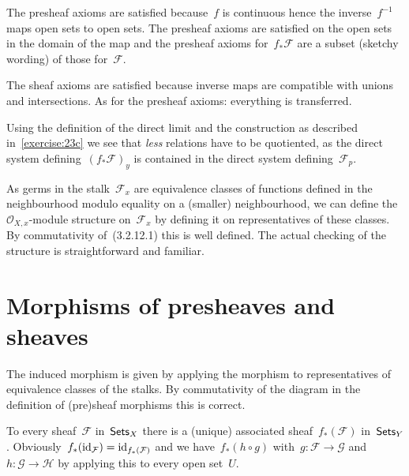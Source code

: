 \begin{exercise}
  The presheaf axioms are satisfied because~$f$ is continuous hence the inverse~$f^{-1}$ maps open sets to open sets. The presheaf axioms are satisfied on the open sets in the domain of the map and the presheaf axioms for~$f_*\mathcal{F}$ are a subset (sketchy wording) of those for~$\mathcal{F}$.

  The sheaf axioms are satisfied because inverse maps are compatible with unions and intersections. As for the presheaf axioms: everything is transferred.
\end{exercise}

\begin{exercise}
  Using the definition of the direct limit and the construction as described in~\autoref{exercise:23c} we see that \emph{less} relations have to be quotiented, as the direct system defining~$(f_*\mathcal{F})_y$ is contained in the direct system defining~$\mathcal{F}_p$.
\end{exercise}

\begin{exercise}
  As germs in the stalk~$\mathcal{F}_x$ are equivalence classes of functions defined in the neighbourhood modulo equality on a (smaller) neighbourhood, we can define the~$\mathcal{O}_{X,x}$\nobreakdash-module structure on~$\mathcal{F}_x$ by defining it on representatives of these classes. By commutativity of~(3.2.12.1) this is well defined. The actual checking of the structure is straightforward and familiar.
\end{exercise}


\section{Morphisms of presheaves and sheaves}

\begin{exercise}
  The induced morphism is given by applying the morphism to representatives of equivalence classes of the stalks. By commutativity of the diagram in the definition of (pre)sheaf morphisms this is correct.
\end{exercise}

\begin{exercise}
  To every sheaf~$\mathcal{F}$ in~$\mathsf{Sets}_X$ there is a (unique) associated sheaf~$f_*(\mathcal{F})$ in~$\mathsf{Sets}_Y$. Obviously~$f_*(\mathrm{id}_\mathcal{F})=\mathrm{id}_{f_*(\mathcal{F})}$ and we have~$f_*(h\circ g)$ with~$g\colon\mathcal{F}\to\mathcal{G}$ and~$h\colon\mathcal{G}\to\mathcal{H}$ by applying this to every open set~$U$.
\end{exercise}

